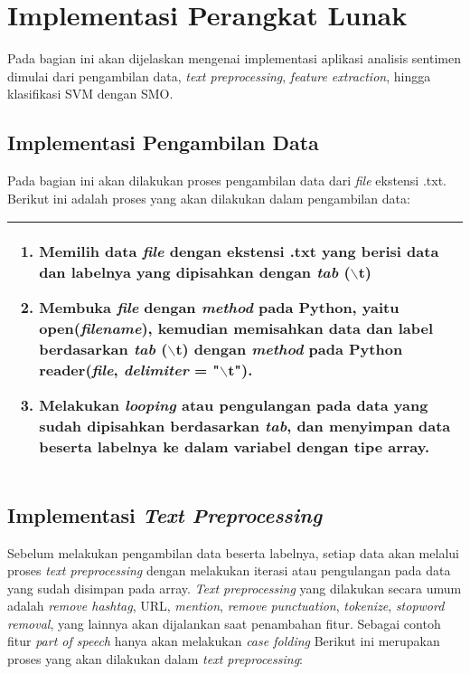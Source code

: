 \section{Implementasi Perangkat Lunak}
Pada bagian ini akan dijelaskan mengenai implementasi aplikasi analisis sentimen dimulai dari pengambilan data, \textit{text preprocessing}, \textit{feature extraction}, hingga klasifikasi SVM dengan SMO.
\subsection{Implementasi Pengambilan Data}
Pada bagian ini akan dilakukan proses pengambilan data dari \textit{file} ekstensi .txt. Berikut ini adalah proses yang akan dilakukan dalam pengambilan data:
\begin{table}[H]
	\normalsize
	\begin{adjustbox}{width=1\textwidth}
	\begin{tabular}{|p{13.55cm}|}
		\hline
		\begin{enumerate}[leftmargin=*]
			\item Memilih data \textit{file} dengan ekstensi .txt yang berisi data dan labelnya yang dipisahkan dengan \textit{tab }($\backslash$t)
			\item Membuka \textit{file} dengan \textit{method} pada Python, yaitu open(\textit{filename}), kemudian memisahkan data dan label berdasarkan \textit{tab} ($\backslash$t) dengan \textit{method} pada Python reader(\textit{file}, \textit{delimiter }= "$\backslash$t").
			\item Melakukan \textit{looping }atau pengulangan pada data yang sudah dipisahkan berdasarkan \textit{tab},	dan menyimpan data beserta labelnya ke dalam variabel dengan tipe	array.
		\end{enumerate}\\
		\hline
	\end{tabular}
	\end{adjustbox}
\end{table}
\subsection{Implementasi \textit{Text Preprocessing}}
Sebelum melakukan pengambilan data beserta labelnya, setiap data akan melalui proses \textit{text preprocessing} dengan melakukan iterasi atau pengulangan pada data yang sudah disimpan pada array. \textit{Text preprocessing }yang dilakukan secara umum adalah \textit{remove 	hashtag}, URL, \textit{mention}, \textit{remove} \textit{punctuation}, \textit{tokenize}, \textit{stopword removal}, yang lainnya akan dijalankan saat penambahan fitur. Sebagai contoh fitur \textit{part of speech} hanya akan melakukan \textit{case folding} Berikut ini merupakan proses yang akan dilakukan dalam \textit{text preprocessing}:

